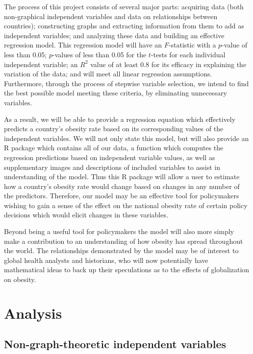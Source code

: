 \documentclass[oneside,12pt]{report}
\begin{document}
The process of this project consists of several major parts: acquiring data (both non-graphical independent variables and data on relationships between countries); constructing graphs and extracting information from them to add as independent variables; and analyzing these data and building an effective regression model. This regression model will have an $F$-statistic with a $p$-value of less than 0.05; $p$-values of less than 0.05 for the $t$-tests for each individual independent variable; an \begin{math}R^2\end{math} value of at least 0.8 for its efficacy in explaining the variation of the data; and will meet all linear regression assumptions. Furthermore, through the process of stepwise variable selection, we intend to find the best possible model meeting these criteria, by eliminating unnecessary variables.

As a result, we will be able to provide a regression equation which effectively predicts a country's obesity rate based on its corresponding values of the independent variables. We will not only state this model, but will also provide an R package which contains all of our data, a function which computes the regression predictions based on independent variable values, as well as supplementary images and descriptions of included variables to assist in understanding of the model. Thus this R package will allow a user to estimate how a country's obesity rate would change based on changes in any number of the predictors. Therefore, our model may be an effective tool for policymakers wishing to gain a sense of the effect on the national obesity rate of certain policy decisions which would elicit changes in these variables.

Beyond being a useful tool for policymakers the model will also more simply make a contribution to an understanding of how obesity has spread throughout the world. The relationships demonstrated by the model may be of interest to global health analysts and historians, who will now potentially have mathematical ideas to back up their speculations as to the effects of globalization on obesity.

\chapter{Analysis}
\label{chap:analysis}

\section*{Non-graph-theoretic independent variables}
\end{document}
